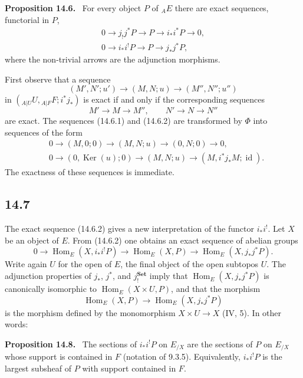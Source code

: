 \documentclass[11pt]{article}
\newcommand{\Set}{\mathbf{Set}}
\newcommand{\Hom}{\operatorname{Hom}}
\newcommand{\id}{\operatorname{id}}
\newcommand{\Ker}{\operatorname{Ker}}
\newenvironment{statement}[1]{\par\medskip\noindent\textbf{#1.}\ }{\par\medskip}
\begin{document}
\begin{statement}{Proposition 14.6}
For every object $P$ of ${}_AE$ there are exact sequences, functorial in $P$,
\begin{gather}
0\longrightarrow j_!j^*P\longrightarrow P\longrightarrow i_*i^*P\longrightarrow 0,\tag{14.6.1}\\
0\longrightarrow i_*i^!P\longrightarrow P\longrightarrow j_*j^*P,\tag{14.6.2}
\end{gather}
where the non-trivial arrows are the adjunction morphisms.
\end{statement}

First observe that a sequence
\[
(M',N';u')\longrightarrow(M,N;u)\longrightarrow(M'',N'';u'')
\]
in $({}_{A|U}U,{}_{A|F}F;i^*j_*)$ is exact if and only if the corresponding sequences
\[
M'\to M\to M'',\qquad N'\to N\to N''
\]
are exact. The sequences (14.6.1) and (14.6.2) are transformed by $\Phi$ into sequences of the form
\begin{align*}
&0\longrightarrow(M,0;0)\longrightarrow(M,N;u)\longrightarrow(0,N;0)\longrightarrow0,\\
&0\longrightarrow(0,\Ker(u);0)\longrightarrow(M,N;u)\longrightarrow(M,i^*j_*M;\id).
\end{align*}
The exactness of these sequences is immediate.

\subsection*{14.7}
The exact sequence (14.6.2) gives a new interpretation of the functor $i_*i^!$. Let $X$ be an object of $E$. From (14.6.2) one obtains an exact sequence of abelian groups
\[
0\longrightarrow \Hom_E(X,i_*i^!P)\longrightarrow \Hom_E(X,P)\longrightarrow \Hom_E(X,j_*j^*P).
\]
Write again $U$ for the open of $E$, the final object of the open subtopos $U$. The adjunction properties of $j_*$, $j^*$, and $j_!^{\Set}$ imply that $\Hom_E(X,j_*j^*P)$ is canonically isomorphic to $\Hom_E(X\times U,P)$, and that the morphism
\[
\Hom_E(X,P)\longrightarrow \Hom_E(X,j_*j^*P)
\]
is the morphism defined by the monomorphism $X\times U\to X$ (IV, 5). In other words:

\begin{statement}{Proposition 14.8}
The sections of $i_*i^!P$ on $E_{/X}$ are the sections of $P$ on $E_{/X}$ whose support is contained in $F$ (notation of 9.3.5). Equivalently, $i_*i^!P$ is the largest subsheaf of $P$ with support contained in $F$.
\end{statement}
\end{document}
